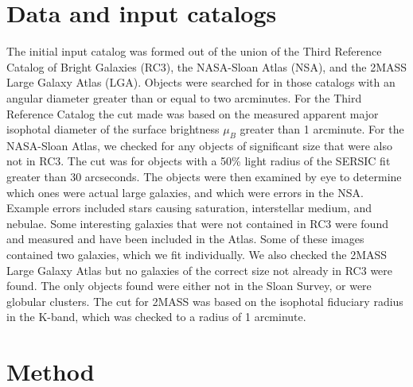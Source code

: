 \documentclass[12pt,preprint,pdftex]{aastex}
\newcommand{\project}[1]{\textsl{#1}}
\begin{document}
\section{Data and input catalogs}


The initial input catalog was formed out of the union of the Third Reference Catalog of Bright Galaxies (RC3), the NASA-Sloan Atlas (NSA), and the 2MASS Large Galaxy Atlas (LGA). Objects were searched for in those catalogs with an angular diameter greater than or equal to two arcminutes. For the Third Reference Catalog the cut made was based on the measured apparent major isophotal diameter of the surface brightness $\mu_{B}$ greater than 1 arcminute. For the NASA-Sloan Atlas, we checked for any objects of significant size that were
also not in RC3. The cut was for objects with a 50\% light radius of
the SERSIC fit greater than 30 arcseconds. The objects were then
examined by eye to determine which ones were actual large galaxies,
and which were errors in the NSA. Example errors included stars
causing saturation, interstellar medium, and nebulae. Some interesting galaxies that were not contained in RC3 were found and measured and have been included in the Atlas. Some of these images contained two galaxies, which we fit individually. We also checked
the 2MASS Large Galaxy Atlas but no galaxies of the correct size not
already in RC3 were found. The only objects found were either not in
the Sloan Survey, or were globular clusters. The cut for 2MASS was
based on the isophotal fiduciary radius in the K-band, which was
checked to a radius of 1 arcminute.

\section{Method}

\end{document}
